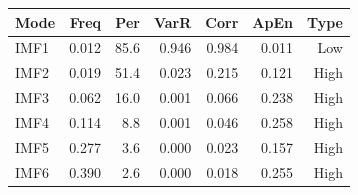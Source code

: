 {\tiny\setlength{\tabcolsep}{1pt}\begin{tabular}{lrrrrrr} \toprule
Mode & Freq & Per & VarR & Corr & ApEn & Type \\ \midrule
IMF1 & 0.012 & 85.6 & 0.946 & 0.984 & 0.011 & Low \\ 
IMF2 & 0.019 & 51.4 & 0.023 & 0.215 & 0.121 & High \\ 
IMF3 & 0.062 & 16.0 & 0.001 & 0.066 & 0.238 & High \\ 
IMF4 & 0.114 & 8.8 & 0.001 & 0.046 & 0.258 & High \\ 
IMF5 & 0.277 & 3.6 & 0.000 & 0.023 & 0.157 & High \\ 
IMF6 & 0.390 & 2.6 & 0.000 & 0.018 & 0.255 & High \\ 
\bottomrule \end{tabular}}